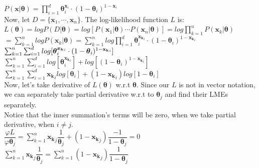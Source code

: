 \documentclass[12pt]{article}
\begin{document}
$P( \boldsymbol{x} | \boldsymbol{\theta} ) = \prod_{i=1}^{d} \boldsymbol{\theta}_i^{\boldsymbol{x}_i} \cdot (1-\boldsymbol{\theta}_i)^{ 1 - \boldsymbol{x}_i } $ \\

Now, let $D=\{ \boldsymbol{x}_1,\cdots,\boldsymbol{x}_n\}$. The log-likelihood function $L$ is: \\

$L( \boldsymbol{\theta} ) = logP(D|\boldsymbol{\theta}) = log[ P(\boldsymbol{x}_1|\boldsymbol{\theta})\cdots P(\boldsymbol{x}_n|\boldsymbol{\theta})] = log\prod_{k=1}^{n} P(\boldsymbol{x}_k|\boldsymbol{\theta})  $ \\

$ = \sum_{k=1}^{n} logP(\boldsymbol{x}_k|\boldsymbol{\theta}) = \sum_{k=1}^{n} log \prod_{i=1}^{d} \boldsymbol{\theta}_i^{\boldsymbol{x_k}_i} \cdot (1-\boldsymbol{\theta}_i)^{ 1 - \boldsymbol{x_k}_i }  $ \\

$ \sum_{k=1}^{n} \sum_{i=1}^{d} log[\boldsymbol{\theta}_i^{\boldsymbol{x_k}_i} \cdot (1-\boldsymbol{\theta}_i)^{ 1 - \bold{x_k}_i }] $ \\

$ \sum_{k=1}^{n} \sum_{i=1}^{d} log[\boldsymbol{\theta}_i^{\boldsymbol{x_k}_i} ] + log[ (1-\boldsymbol{\theta}_i)^{ 1 - \boldsymbol{x_k}_i }] $ \\

$ \sum_{k=1}^{n} \sum_{i=1}^{d} \boldsymbol{x_k}_ilog[\boldsymbol{\theta}_i] + (1 - \boldsymbol{x_k}_i)log[1-\boldsymbol{\theta}_i] $ \\

Now, let's take derivative of $L(\boldsymbol{\theta})$ w.r.t $\boldsymbol{\theta}$. Since our $L$ is not in vector notation, we can separately take partial derivative w.r.t to $\boldsymbol{\theta}_j$ and find their LMEs separately. \\

Notice that the inner summation's terms will be zero, when we take partial derivative, when $i\neq j$.\\

$\dfrac{\varphi L}{\varphi \boldsymbol{\theta}_j} =  \sum_{k=1}^{n} \boldsymbol{x_k}_j \dfrac{1}{\boldsymbol{\theta}_j} + (1 - \boldsymbol{x_k}_j)\dfrac{-1}{1-\boldsymbol{\theta}_j} = 0$ \\

$ \sum_{k=1}^{n} \boldsymbol{x_k}_j \dfrac{1}{\boldsymbol{\theta}_j} = \sum_{k=1}^{n} (1 - \boldsymbol{x_k}_j)\dfrac{1}{1-\boldsymbol{\theta}_j} $ \\
\end{document}
